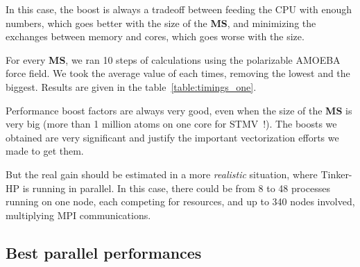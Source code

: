 \documentclass[9pt,comparison]{livecoms}
\begin{document}
In this case, the boost is always a tradeoff between feeding the CPU with enough numbers, which goes better with the size of the \textbf{MS}, and minimizing the exchanges between memory and cores, which goes worse with the size. 

For every \textbf{MS}, we ran 10 steps of calculations using the polarizable AMOEBA force field. We took the average value of each times, removing the lowest and the biggest. Results are given in the table~\ref{table:timings_one}.

Performance boost factors are always very good, even when the size of the \textbf{MS} is very big (more than 1 million atoms on one core for STMV~!). The boosts we obtained are very significant and justify the important vectorization efforts we made to get them.

But the real gain should be estimated in a more \emph{realistic} situation, where Tinker-HP is running in parallel. In this case, there could be from 8 to 48 processes running on one node, each competing for resources, and up to 340 nodes involved, multiplying MPI communications.
\subsection{Best parallel performances}
\end{document}
